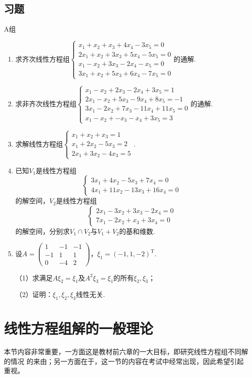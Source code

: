 \subsection{习题}
\centerline{\heiti A组}
\begin{enumerate}
	\item 求齐次线性方程组$\begin{cases}
		x_1+x_2+x_3+4x_4-3x_5=0 \\
		2x_1+x_2+3x_3+5x_4-5x_5=0 \\
		x_1-x_2+3x_3-2x_4-x_5=0 \\
		3x_1+x_2+5x_3+6x_4-7x_5=0
	\end{cases}$的通解.
	\item 求非齐次线性方程组$\begin{cases}
		x_1-x_2+2x_3-2x_4+3x_5=1 \\
		2x_1-x_2+5x_3-9x_4+8x_5=-1 \\
		3x_1-2x_2+7x_3-11x_4+11x_5=0 \\
		x_1-x_2+-x_3-x_4+3x_5=3
	\end{cases}$的通解.
	\item 求解线性方程组$\begin{cases}
		x_1+x_2+x_3=1 \\ x_1+2x_2-5x_3=2 \\ 2x_1+3x_2-4x_3=5
	\end{cases}$.
	\item 已知$V_1$是线性方程组$$\begin{cases}
		3x_1+4x_2-5x_3+7x_4=0 \\
		4x_1+11x_2-13x_3+16x_4=0
	\end{cases}$$
	的解空间，$V_2$是线性方程组$$\begin{cases}
		2x_1-3x_2+3x_3-2x_4=0 \\
		7x_1-2x_2+x_3+3x_4=0
	\end{cases}$$
	的解空间，分别求$V_1 \cap V_2$与$V_1+V_2$的基和维数.
	\item 设$A=\begin{pmatrix}
		1 & -1 & -1 \\ -1 & 1 & 1 \\ 0 & -4 & 2
	\end{pmatrix}$，$\xi_1=(-1,1,-2)^\mathrm{T}$.

	（1）求满足$A\xi_2=\xi_1$及$A^2\xi_3=\xi_1$的所有$\xi_2,\xi_3$；

	（2）证明：$\xi_1,\xi_2,\xi_3$线性无关.
\end{enumerate}

\section{线性方程组解的一般理论}
本节内容非常重要，一方面这是教材前六章的一大目标，即研究线性方程组不同解的情况
的来由；另一方面在于，这一节的内容在考试中经常出现，因此希望引起重视。

